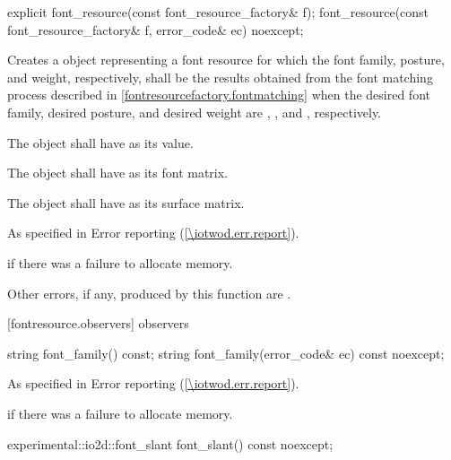 \begin{itemdecl}
explicit font_resource(const font_resource_factory& f);
font_resource(const font_resource_factory& f, error_code& ec) noexcept;
\end{itemdecl}
\begin{itemdescr}
\pnum
\effects
Creates a  object representing a font resource for which the font family, posture, and weight, respectively, shall be the results obtained from the font matching process described in \ref{fontresourcefactory.fontmatching} when the desired font family, desired posture, and desired weight are , , and , respectively.

\pnum
The  object shall have  as its  value.

\pnum
The  object shall have  as its font matrix.

\pnum
The  object shall have  as its surface matrix.

\pnum
\throws
As specified in Error reporting (\ref{\iotwod.err.report}).

\pnum
\errors
{} if there was a failure to allocate memory.

\pnum
Other errors, if any, produced by this function are .
\end{itemdescr}

 [fontresource.observers] { observers}

\begin{itemdecl}
string font_family() const;
string font_family(error_code& ec) const noexcept;
\end{itemdecl}
\begin{itemdescr}
\pnum
\returns

\throws
As specified in Error reporting (\ref{\iotwod.err.report}).

\pnum
\errors
{} if there was a failure to allocate memory.
\end{itemdescr}

\begin{itemdecl}
experimental::io2d::font_slant font_slant() const noexcept;
\end{itemdecl}
\begin{itemdescr}
\pnum
\returns

\end{itemdescr}


